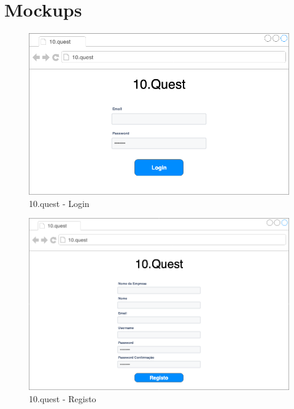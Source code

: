 \chapter{Mockups}
\label{a:prototipos}

\begin{figure}[ht!]
	\begin{center}
		\includegraphics[width=1\textwidth]{img/prototipos/1.png}
		\caption{10.quest - Login}
		\label{10q-login}
	\end{center}
\end{figure}

\begin{figure}[ht!]
	\begin{center}
		\includegraphics[width=1\textwidth]{img/prototipos/2.png}
		\caption{10.quest - Registo}
		\label{10q-registo}
	\end{center}
\end{figure}

